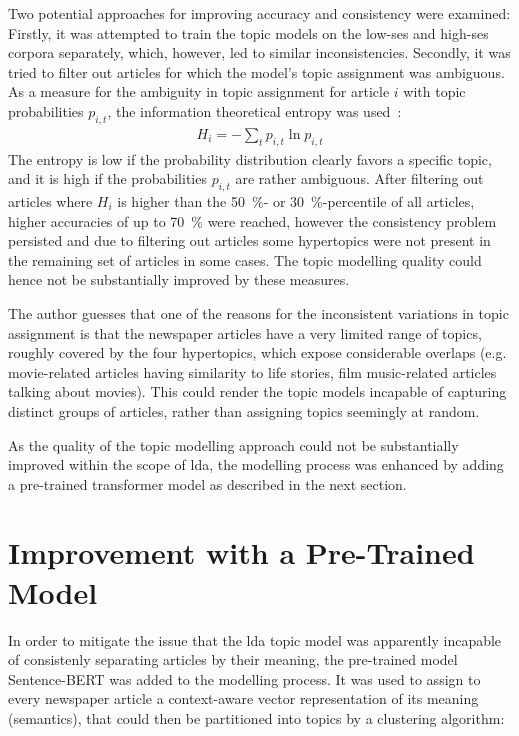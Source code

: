 Two potential approaches for improving accuracy and consistency were examined: Firstly, it was attempted to train the topic models on the low-\gls{ses} and high-\gls{ses} corpora separately, which, however, led to similar inconsistencies. Secondly, it was tried to filter out articles for which the model's topic assignment was ambiguous. As a measure for the ambiguity in topic assignment for article $i$ with topic probabilities $p_{i, t}$, the information theoretical entropy was used~\autocite{gray_entropy_2013}:
\begin{align}
    H_i = -\sum_t p_{i, t} \ln p_{i,t}
\end{align}
The entropy is low if the probability distribution clearly favors a specific topic, and it is high if the probabilities $p_{i, t}$ are rather ambiguous. After filtering out articles where $H_i$ is higher than the \SI{50}{\percent}- or \SI{30}{\percent}-percentile of all articles, higher accuracies of up to \SI{70}{\percent} were reached, however the consistency problem persisted and due to filtering out articles some hypertopics were not present in the remaining set of articles in some cases. The topic modelling quality could hence not be substantially improved by these measures.

The author guesses that one of the reasons for the inconsistent variations in topic assignment is that the newspaper articles have a very limited range of topics, roughly covered by the four hypertopics, which expose considerable overlaps (e.g. movie-related articles having similarity to life stories, film music-related articles talking about movies). This could render the topic models incapable of capturing distinct groups of articles, rather than assigning topics seemingly at random.

As the quality of the topic modelling approach could not be substantially improved within the scope of \gls{lda}, the modelling process was enhanced by adding a pre-trained transformer model as described in the next section.

\section{Improvement with a Pre-Trained Model}\label{ch:pretrained_topic_modelling}
In order to mitigate the issue that the \gls{lda} topic model was apparently incapable of consistenly separating articles by their meaning, the pre-trained model Sentence-BERT was added to the modelling process. It was used to assign to every newspaper article a context-aware vector representation of its meaning (semantics), that could then be partitioned into topics by a clustering algorithm:

